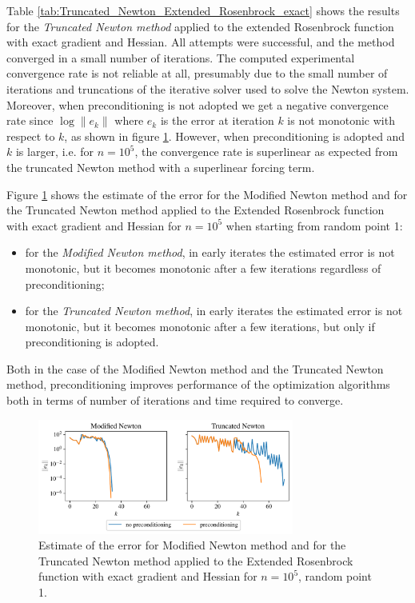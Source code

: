 Table \ref{tab:Truncated_Newton_Extended_Rosenbrock_exact} shows the results for the \textit{Truncated Newton method} applied to the extended Rosenbrock function with exact gradient and Hessian.
All attempts were successful, and the method converged in a small number of iterations.
The computed experimental convergence rate is not reliable at all, presumably due to the small number of iterations and truncations of the iterative solver used to solve the Newton system.
Moreover, when preconditioning is not adopted we get a negative convergence rate since $\log \lVert e_k \rVert$ where $e_k$ is the error at iteration $k$ is not monotonic with respect to $k$, as shown in figure \ref{fig:extended_rosenbrock_error}.
However, when preconditioning is adopted and $k$ is larger, i.e. for $n = 10^5$, the convergence rate is superlinear as expected from the truncated Newton method with a superlinear forcing term.

Figure \ref{fig:extended_rosenbrock_error} shows the estimate of the error for the Modified Newton method and for the Truncated Newton method applied to the Extended Rosenbrock function with exact gradient and Hessian for $n=10^5$ when starting from random point 1:
\begin{itemize}
\item for the \textit{Modified Newton method}, in early iterates the estimated error is not monotonic, but it becomes monotonic after a few iterations regardless of preconditioning;
\item for the \textit{Truncated Newton method}, in early iterates the estimated error is not monotonic, but it becomes monotonic after a few iterations, but only if preconditioning is adopted.
\end{itemize}
Both in the case of the Modified Newton method and the Truncated Newton method, preconditioning improves performance of the optimization algorithms both in terms of number of iterations and time required to converge.

\begin{figure}
    \centering
    \includegraphics[width=0.75\textwidth]{figures/extended_rosenbrock_error.pdf}
    \caption{Estimate of the error for Modified Newton method and for the Truncated Newton method applied to the Extended Rosenbrock function with exact gradient and Hessian for $n=10^5$, random point 1.}
    \label{fig:extended_rosenbrock_error}
\end{figure}

